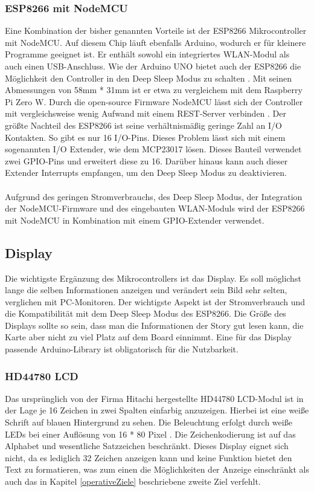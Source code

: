 \documentclass[12pt,titlepage]{scrartcl}
\begin{document}
			\subsubsection{ESP8266 mit NodeMCU}
			Eine Kombination der bisher genannten Vorteile ist der ESP8266 Mikrocontroller mit NodeMCU. Auf diesem Chip läuft ebenfalls Arduino, wodurch er für kleinere Programme geeignet ist. Er enthält sowohl ein integriertes WLAN-Modul als auch einen USB-Anschluss. Wie der Arduino UNO bietet auch der ESP8266 die Möglichkeit den Controller in den Deep Sleep Modus zu schalten \cite{esp8266general}. Mit seinen Abmessungen von 58mm * 31mm ist er etwa zu vergleichem mit dem Raspberry Pi Zero W. Durch die open-source Firmware NodeMCU lässt sich der Controller mit vergleichsweise wenig Aufwand mit einem REST-Server verbinden \cite{nodemcuexamples}. Der größte Nachteil des ESP8266 ist seine verhältnismäßig geringe Zahl an I/O Kontakten. So gibt es nur 16 I/O-Pins. Dieses Problem lässt sich mit einem sogenannten I/O Extender, wie dem MCP23017 lösen. Dieses Bauteil verwendet zwei GPIO-Pins und erweitert diese zu 16. Darüber hinaus kann auch dieser Extender Interrupts empfangen, um den Deep Sleep Modus zu deaktivieren. \\ \\
			Aufgrund des geringen Stromverbrauchs, des Deep Sleep Modus, der Integration der NodeMCU-Firmware und des eingebauten WLAN-Moduls wird der ESP8266 mit NodeMCU in Kombination mit einem GPIO-Extender verwendet.
		\subsection{Display}
		Die wichtigste Ergänzung des Mikrocontrollers ist das Display. Es soll möglichst lange die selben Informationen anzeigen und verändert sein Bild sehr selten, verglichen mit PC-Monitoren. Der wichtigste Aspekt ist der Stromverbrauch und die Kompatibilität mit dem Deep Sleep Modus des ESP8266.  Die Größe des Displays sollte so sein, dass man die Informationen der Story gut lesen kann, die Karte aber nicht zu viel Platz auf dem Board einnimmt. Eine für das Display passende Arduino-Library ist obligatorisch für die Nutzbarkeit.
			\subsubsection{HD44780 LCD}
			Das ursprünglich von der Firma Hitachi hergestellte HD44780 LCD-Modul ist in der Lage je 16 Zeichen in zwei Spalten einfarbig anzuzeigen. Hierbei ist eine weiße Schrift auf blauen Hintergrund zu sehen. Die Beleuchtung erfolgt durch weiße LEDs bei einer Auflösung von 16 * 80 Pixel \cite{hd44780manual}. Die Zeichenkodierung ist auf das Alphabet und wesentliche Satzzeichen beschränkt. Dieses Display eignet sich nicht, da es lediglich 32 Zeichen anzeigen kann und keine Funktion bietet den Text zu formatieren, was zum einen die Möglichkeiten der Anzeige einschränkt als auch das in Kapitel \ref{operativeZiele} beschriebene zweite Ziel verfehlt.
\end{document}
